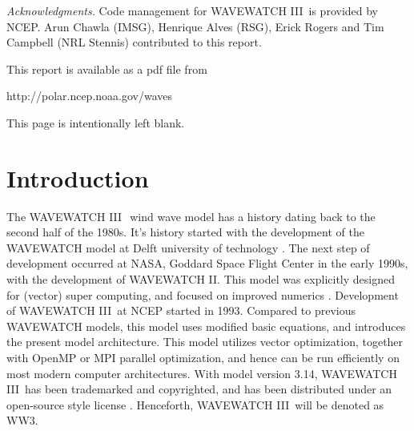 \documentclass[12pt]{article}
\newcommand{\pstyle}{plain}
\newcommand{\wwt}{WAVEWATCH III$\:$\textsuperscript\textregistered}
\newcommand{\ww}{WAVEWATCH III}
\newcommand{\ws}{WW3}
\newcommand{\pb}{\strut \vfill \pagebreak}
\newcommand{\bpagea}{\strut

\vspace{2.5in} \centerline{This page is intentionally left blank.}}
\newcommand{\newsec}{\setcounter{equation}{0}
                      \setcounter{myfigno}{0}
                      \setcounter{mytabno}{0}}
\newcounter{myfigno}[section]
\newcounter{mytabno}[section]
\begin{document}
\vfill \pagebreak


{}

{\it Acknowledgments.} Code management for \ww\ is provided by NCEP. Arun
Chawla (IMSG), Henrique Alves (RSG), Erick Rogers and Tim Campbell (NRL
Stennis) contributed to this report.

\vspace{\baselineskip} \noindent
This report is available as a pdf file from

\vspace{\baselineskip}
\centerline{http://polar.ncep.noaa.gov/waves}


\vfill \pagebreak
{}

\tableofcontents

\pb
\pagestyle{empty}

\bpagea


\pb
\pagestyle{\pstyle}
\section{Introduction} \label{sec:intro}
\newsec

\noindent
The \wwt\ wind wave model has a history dating back to the second half of the
1980s. It's history started with the development of the WAVEWATCH model at
Delft university of technology \citep{tol:CHGE89, tol:CHGE90, tol:JPO91b}. The
next step of development occurred at NASA, Goddard Space Flight Center in the
early 1990s, with the development of WAVEWATCH II. This model was explicitly
designed for (vector) super computing, and focused on improved numerics
\citep{tol:JPO92, tol:ICCE92}. Development of \ww\ at NCEP started in 1993.
Compared to previous WAVEWATCH models, this model uses modified basic
equations, and introduces the present model architecture. This model utilizes
vector optimization, together with OpenMP or MPI parallel optimization, and
hence can be run efficiently on most modern computer architectures.  With
model version 3.14, \ww\ has been trademarked and copyrighted, and has been
distributed under an open-source style license \citep[see section 1.2 of ][or
the web
site\footnote{~http://polar.ncep.noaa.gov/waves/wavewatch/license.shtml
}]{tol:MMAB09a}. Henceforth, \ww\ will be denoted as \ws.
\end{document}
